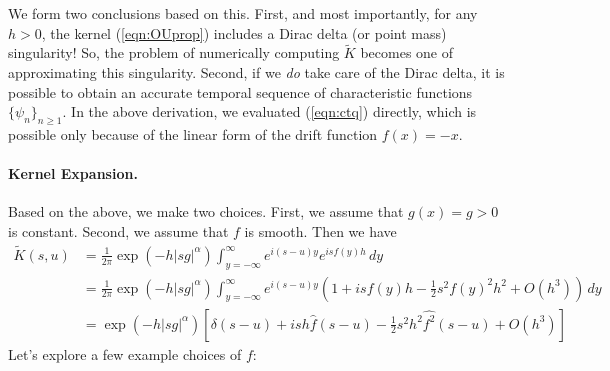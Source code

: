 \documentclass[12pt]{l4dc2021}
\begin{document}
We form two conclusions based on this.  First, and most importantly, for any $h > 0$, the kernel (\ref{eqn:OUprop}) includes a Dirac delta (or point mass) singularity!  So, the problem of numerically computing $\widetilde{K}$ becomes one of approximating this singularity.  Second, if we \emph{do} take care of the Dirac delta, it is possible to obtain an accurate temporal sequence of characteristic functions $\{ \psi_n \}_{n \geq 1}$.  In the above derivation, we evaluated (\ref{eqn:ctq}) directly, which is possible only because of the linear form of the drift function $f(x) = -x$.

\paragraph{Kernel Expansion.} Based on the above, we make two choices.  First, we assume that $g(x) = g > 0$ is constant.  Second, we assume that $f$ is smooth.  Then we have
\begin{align}
\widetilde{K}(s,u) &= \frac{1}{2\pi} \exp{\left(  -h |s g|^{\alpha} \right)} \int_{y=-\infty}^{\infty}e^{i(s-u)y} e^{i s f(y) h} \, dy \nonumber \\
 &= \frac{1}{2\pi} \exp{\left(  -h |s g|^{\alpha} \right)} \int_{y=-\infty}^\infty e^{i(s-u) y} (1 + i s f(y) h - \frac{1}{2} s^2 f(y)^2 h^2 + O(h^3) ) \, dy \nonumber \\
 \label{eqn:kernelexpan}
 &= \exp{\left(  -h |s g|^{\alpha} \right)} \left[ \delta(s-u) + i s h \widehat{f}(s-u) - \frac{1}{2} s^2 h^2 \widehat{f^2}(s-u) + O(h^3) \right]
 \end{align}
Let's explore a few example choices of $f$:
\end{document}
